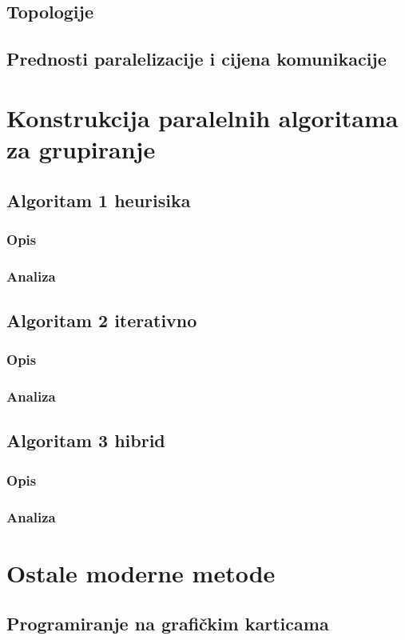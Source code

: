 \documentclass[a4paper,twoside,12pt]{memoir} %
\begin{document}
\section[Topologija][topologija]{Topologije}
\section[Prednosti paralelizacije i cijena komunikacije][pred-man-paralel]{Prednosti paralelizacije i cijena komunikacije}
\chapter{Konstrukcija paralelnih algoritama za grupiranje}
\section{Algoritam 1 heurisika}
\subsection{Opis}
\subsection{Analiza}
\section{Algoritam 2 iterativno}
\subsection{Opis}
\subsection{Analiza}
\section{Algoritam 3 hibrid}
\subsection{Opis}
\subsection{Analiza}
\chapter{Ostale moderne metode}
\section{Programiranje na grafičkim karticama}
\end{document}
